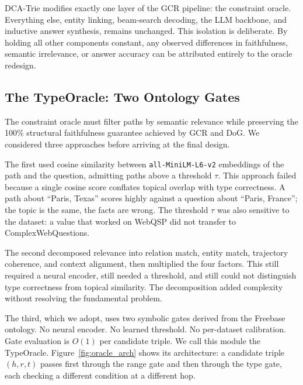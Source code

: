 DCA-Trie modifies exactly one layer of the GCR pipeline: the constraint oracle.
Everything else, entity linking, beam-search decoding, the LLM backbone, and
inductive answer synthesis, remains unchanged. This isolation is deliberate. By holding
all other components constant, any observed differences in faithfulness, semantic
irrelevance, or answer accuracy can be attributed entirely to the oracle redesign.

\subsection{The TypeOracle: Two Ontology Gates}
\label{sec:method:oracle:type}

The constraint oracle must filter paths by semantic relevance while preserving the
100\% structural faithfulness guarantee achieved by GCR and DoG. We considered three
approaches before arriving at the final design.

The first used cosine similarity between \texttt{all-MiniLM-L6-v2} embeddings of the
path and the question, admitting paths above a threshold $\tau$. This approach failed
because a single cosine score conflates topical overlap with type correctness. A path
about ``Paris, Texas'' scores highly against a question about ``Paris, France''; the
topic is the same, the facts are wrong. The threshold $\tau$ was also sensitive to the
dataset: a value that worked on WebQSP did not transfer to ComplexWebQuestions.

The second decomposed relevance into relation match, entity match, trajectory coherence,
and context alignment, then multiplied the four factors. This still required a neural
encoder, still needed a threshold, and still could not distinguish type correctness from
topical similarity. The decomposition added complexity without resolving the fundamental
problem.

The third, which we adopt, uses two symbolic gates derived from the Freebase ontology.
No neural encoder. No learned threshold. No per-dataset calibration. Gate evaluation is
$O(1)$ per candidate triple. We call this module the TypeOracle.
Figure~\ref{fig:oracle_arch} shows its architecture: a candidate triple $(h, r, t)$
passes first through the range gate and then through the type gate, each checking a
different condition at a different hop.

